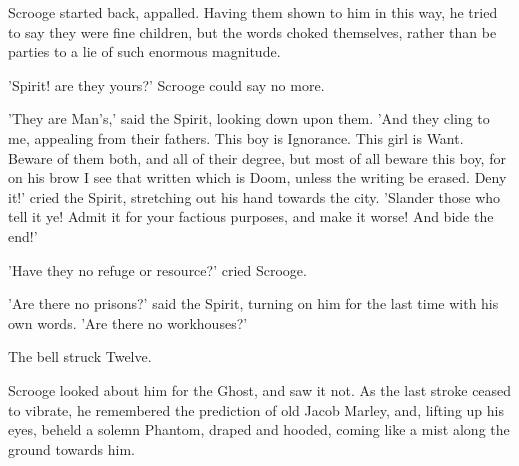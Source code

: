 Scrooge started back, appalled. Having them shown to him in this way, he
tried to say they were fine children, but the words choked themselves,
rather than be parties to a lie of such enormous magnitude.

'Spirit! are they yours?' Scrooge could say no more.

'They are Man's,' said the Spirit, looking down upon them. 'And they
cling to me, appealing from their fathers. This boy is Ignorance. This
girl is Want. Beware of them both, and all of their degree, but most of
all beware this boy, for on his brow I see that written which is Doom,
unless the writing be erased. Deny it!' cried the Spirit, stretching out
his hand towards the city. 'Slander those who tell it ye! Admit it for
your factious purposes, and make it worse! And bide the end!'

'Have they no refuge or resource?' cried Scrooge.

'Are there no prisons?' said the Spirit, turning on him for the last
time with his own words. 'Are there no workhouses?'

The bell struck Twelve.

Scrooge looked about him for the Ghost, and saw it not. As the last
stroke ceased to vibrate, he remembered the prediction of old Jacob
Marley, and, lifting up his eyes, beheld a solemn Phantom, draped and
hooded, coming like a mist along the ground towards him.

